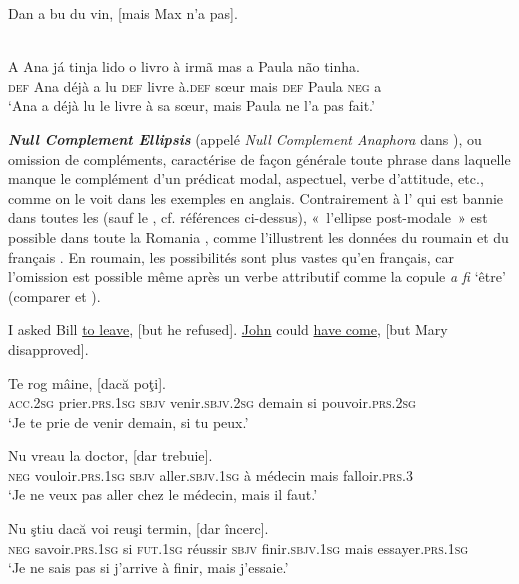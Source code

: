 \ex  *Dan a bu du vin, [mais Max n’a pas]. \label{ch1:ex61b}

\ex
{}\\
\gll   A  Ana  já  tinja  lido  o  livro  à  irmã  mas  a  Paula  não  tinha. \label{ch1:ex61c} \\
    \textsc{def}  Ana  déjà  a  lu  \textsc{def}  livre  à.\textsc{def}  sœur  mais  \textsc{def}  Paula  \textsc{neg}  a \\
\glt ‘Ana a déjà lu le livre à sa sœur, mais Paula ne l’a pas fait.’
\z
\z

\textbf{\textit{Null Complement Ellipsis}} (appelé \textit{Null Complement Anaphora} dans \citealt{HankamerEtAl1976}), ou omission de compléments, caractérise de façon générale toute phrase dans laquelle manque le complément d’un prédicat modal, aspectuel, verbe d’attitude, etc., comme on le voit dans les exemples  en anglais. Contrairement à l’ qui est bannie dans toutes les  (sauf le , cf. références ci-dessus), «~l’ellipse post-modale~» est possible dans toute la Romania \citep{Dagnac2008,Dagnac2010}, comme l’illustrent les données du roumain  et du français . En roumain, les possibilités sont plus vastes qu’en français, car l’omission est possible même après un verbe attributif comme la copule \textit{a fi} ‘être’ (comparer  et ).

\ea \label{ch1:ex62}
\ea  I asked Bill \uline{to leave}, [but he refused].
\ex  \uline{John} could \uline{have come}, [but Mary disapproved].
\z
\z

\ea	\label{ch1:ex63}
\ea 
\gll   Te  rog     mâine,  [dacă  poţi].\\ 
\textsc{acc.2sg}  prier.\textsc{prs.1sg}  \textsc{sbjv}  venir.\textsc{sbjv.2sg}  demain  si  pouvoir.\textsc{prs.2sg}\\
\glt ‘Je te prie de venir demain, si tu peux.’ 

\ex 
\gll  Nu  vreau    la doctor,  [dar  trebuie].\\ 
  \textsc{neg}  vouloir.\textsc{prs.1sg}  \textsc{sbjv}  aller.\textsc{sbjv.1sg}  à  médecin  mais  falloir.\textsc{prs.3} \\
\glt ‘Je ne veux pas aller chez le médecin, mais il faut.’ 

\ex
\gll  Nu  ştiu  dacă  voi  reuşi   termin,  [dar  încerc].\\
  \textsc{neg}  savoir.\textsc{prs.1sg}  si  \textsc{fut.1sg}  réussir  \textsc{sbjv}  finir.\textsc{sbjv.1sg}  mais  essayer.\textsc{prs.1sg} \\
\glt ‘Je ne sais pas si j’arrive à finir, mais j’essaie.’ 

